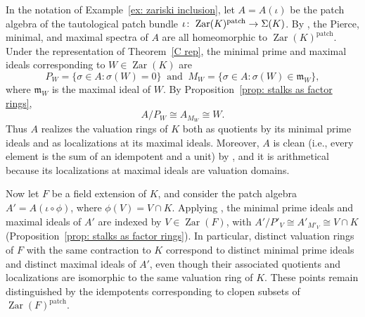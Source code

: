 \documentclass[11pt]{amsart}
\begin{document}
\begin{example}
In the notation of Example~\ref{ex: zariski inclusion}, let $A=A(\iota)$ be the patch algebra of the tautological patch bundle $\iota\colon\; {\rm Zar}(K)^{\mathrm{patch}}\to \Sigma(K)$. By \cite[Example~7.7]{CosOlb}, the Pierce, minimal, and maximal spectra of $A$ are all homeomorphic to $\operatorname{Zar}(K)^{\mathrm{patch}}$. Under the representation of Theorem~\ref{C rep},
the minimal prime and maximal ideals corresponding
to $W\in\operatorname{Zar}(K)$ are
\[
P_W=\{\sigma\in A:\sigma(W)=0\} \: {\mbox{ and }} \:
M_W=\{\sigma\in A:\sigma(W)\in\mathfrak m_W\},
\]
where $\mathfrak m_W$ is the maximal ideal of $W$.
By Proposition~\ref{prop: stalks as factor rings},
\[
A/P_W\cong A_{M_W}\cong W.
\]
Thus $A$ realizes the valuation rings of $K$ both as quotients by its minimal prime ideals and as localizations at its maximal ideals. 
Moreover, $A$ is clean (i.e., every element is the sum of an idempotent and a unit) by \cite[Proposition~7.5]{CosOlb}, and it is arithmetical because its localizations at maximal ideals are valuation domains. 

Now let $F$ be a field extension of $K$, and consider the patch algebra $A'=A(\iota\circ\phi)$, where $\phi(V)=V\cap K$. Applying \cite[Theorem~6.9 and Propositions~7.4--7.5]{CosOlb},
the minimal prime ideals and maximal ideals of $A'$ are indexed by $V\in\operatorname{Zar}(F)$, with $A'/P'_V\cong A'_{M'_V}\cong V\cap K$ (Proposition~\ref{prop: stalks as factor rings}).
In particular, distinct valuation rings of $F$ with the same contraction to $K$ correspond to distinct minimal prime ideals and distinct maximal ideals of $A'$, even though their associated quotients and localizations are isomorphic to the same valuation ring of $K$. These points remain distinguished by the
idempotents corresponding to clopen subsets of $\operatorname{Zar}(F)^{\mathrm{patch}}$.
\end{example}
\end{document}

